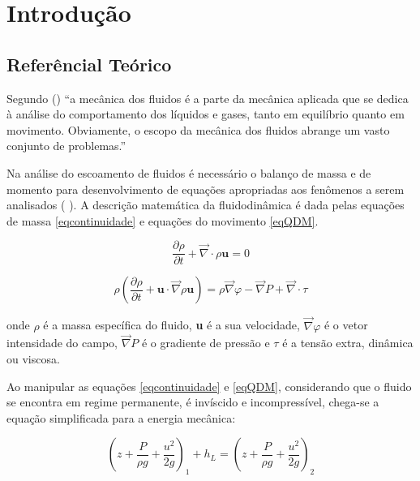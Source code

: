 \newcommand{\citeay}[1]{\citeauthoronline{#1} (\citeyear{#1})}
\newcommand{\citeayp}[1]{(\citeauthoronline{#1} \citeyear{#1})}
\newcommand{\citean}[1]{\citeauthoronline{#1} \cite{#1}}

\chapter{Introdução}\label{intro}

\section{Referêncial Teórico}

Segundo \citeay{Munson04} ``a mecânica dos fluidos é a parte 
da mecânica aplicada que se dedica à
análise do comportamento dos líquidos e gases, tanto em equilíbrio quanto em 
movimento. Obviamente, o escopo da mecânica
dos fluidos abrange um vasto conjunto de 
problemas.''

Na análise do escoamento de fluidos é necessário o 
balanço de massa e de momento para desenvolvimento de equações
apropriadas aos fenômenos a serem analisados \citeayp{Cremasco14}.
A descrição matemática da fluidodinâmica é dada pelas 
equações de massa \eqref{eqcontinuidade}
e equações do movimento \eqref{eqQDM}.


\begin{equation}\label{eqcontinuidade}
    \frac{\partial\rho}{\partial t} + 
    \vec{\nabla} \cdot \rho \textbf{u}  = 0
\end{equation}

\begin{equation}\label{eqQDM}
    \rho \left(
        \frac{\partial \rho}{\partial t} + 
    \textbf{u} \cdot \vec{\nabla}\rho\textbf{u}
    \right)
    = 
    \rho\vec{\nabla}\varphi -
    \vec{\nabla} P +
    \vec{\nabla}\cdot \tau
\end{equation}

onde $\rho$ é a massa específica do fluido, \textbf{u} é a sua velocidade,
$\vec{\nabla}\varphi$ é o vetor intensidade do campo, $\vec{\nabla} P$ é o gradiente
de pressão e $\tau$ é a tensão extra, dinâmica ou viscosa.

Ao manipular as equações \eqref{eqcontinuidade} e 
\eqref{eqQDM}, considerando que o fluido se encontra em
regime permanente, é invíscido e incompressível, chega-se a
equação simplificada para a energia mecânica:

\begin{equation}\label{eqBern}
    \left(
        z + \frac{P}{\rho g} + \frac{u^2}{2g}
    \right)_{1}
    + h_L
    =
    \left(
        z + \frac{P}{\rho g} + \frac{u^2}{2g}
    \right)_{2}
\end{equation}

